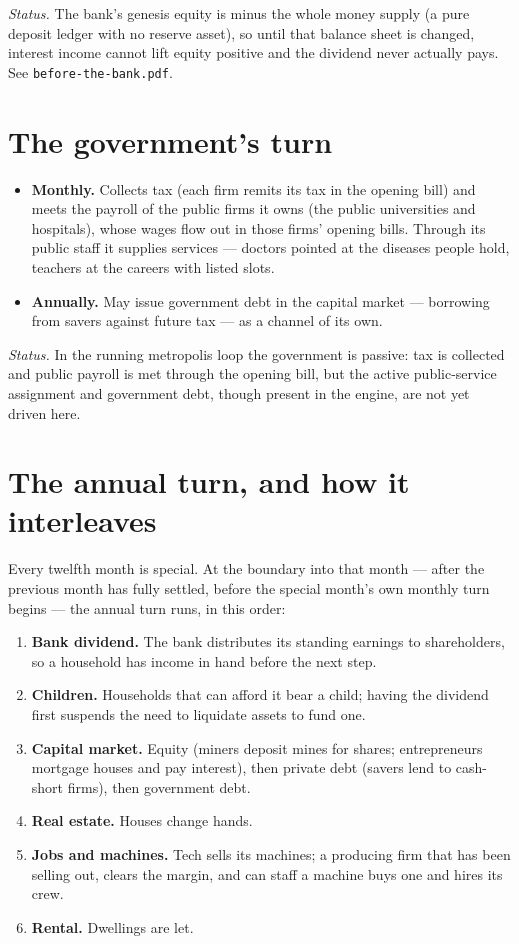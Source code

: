 \documentclass[11pt]{article}
\begin{document}
\noindent\textit{Status.} The bank's genesis equity is minus the whole money
supply (a pure deposit ledger with no reserve asset), so until that balance sheet
is changed, interest income cannot lift equity positive and the dividend never
actually pays. See \texttt{before-the-bank.pdf}.

\section{The government's turn}

\begin{itemize}
\item \textbf{Monthly.} Collects tax (each firm remits its tax in the opening
bill) and meets the payroll of the public firms it owns (the public universities
and hospitals), whose wages flow out in those firms' opening bills. Through its
public staff it supplies services --- doctors pointed at the diseases people hold,
teachers at the careers with listed slots.
\item \textbf{Annually.} May issue government debt in the capital market ---
borrowing from savers against future tax --- as a channel of its own.
\end{itemize}

\noindent\textit{Status.} In the running metropolis loop the government is
passive: tax is collected and public payroll is met through the opening bill, but
the active public-service assignment and government debt, though present in the
engine, are not yet driven here.

\section{The annual turn, and how it interleaves}

Every twelfth month is special. At the boundary into that month --- after the
previous month has fully settled, before the special month's own monthly turn
begins --- the annual turn runs, in this order:

\begin{enumerate}
\item \textbf{Bank dividend.} The bank distributes its standing earnings to
shareholders, so a household has income in hand before the next step.
\item \textbf{Children.} Households that can afford it bear a child; having the
dividend first suspends the need to liquidate assets to fund one.
\item \textbf{Capital market.} Equity (miners deposit mines for shares;
entrepreneurs mortgage houses and pay interest), then private debt (savers lend to
cash-short firms), then government debt.
\item \textbf{Real estate.} Houses change hands.
\item \textbf{Jobs and machines.} Tech sells its machines; a producing firm that
has been selling out, clears the margin, and can staff a machine buys one and
hires its crew.
\item \textbf{Rental.} Dwellings are let.
\end{enumerate}
\end{document}
